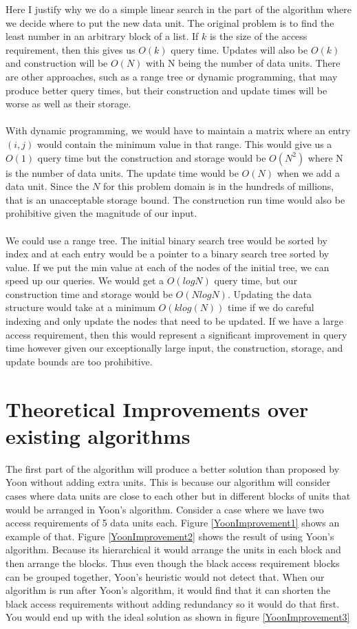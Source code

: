 \documentclass[conference]{acmsiggraph}
\begin{document}
Here I justify why we do a simple linear search in the part of the algorithm where we decide where to put the new data unit. The original problem is to find the least number in an arbitrary block of a list. If $k$ is the size of the access requirement, then this gives us $O(k)$ query time. Updates will also be $O(k)$ and construction will be $O(N)$ with N being the number of data units. There are other approaches, such as a range tree or dynamic programming, that may produce better query times, but their construction and update times will be worse as well as their storage. \\
\\
With dynamic programming, we would have to maintain a matrix where an entry $(i,j)$ would contain the minimum value in that range. This would give us a $O(1)$ query time but the construction and storage would be $O(N^2)$ where N is the number of data units. The update time would be $O(N)$ when we add a data unit. Since the $N$ for this problem domain is in the hundreds of millions, that is an unacceptable storage bound. The construction run time would also be prohibitive given the magnitude of our input. \\
\\
We could use a range tree. The initial binary search tree would be sorted by index and at each entry would be a pointer to a binary search tree sorted by value. If we put the min value at each of the nodes of the initial tree, we can speed up our queries. We would get a $O(log N)$ query time, but our construction time and storage would be $O(N log N)$. Updating the data structure would take at a minimum $O(k log(N))$ time if we do careful indexing and only update the nodes that need to be updated. If we have a large access requirement, then this would represent a significant improvement in query time however given our exceptionally large input, the construction, storage, and update bounds are too prohibitive.  


\section{Theoretical Improvements over existing algorithms}

The first part of the algorithm will produce a better solution than proposed by Yoon without adding extra units. This is because our algorithm will consider cases where data units are close to each other but in different blocks of units that would be arranged in Yoon's algorithm. Consider a case where we have two access requirements of 5 data units each. Figure \ref{YoonImprovement1} shows an example of that. Figure \ref{YoonImprovement2} shows the result of using Yoon's algorithm. Because its hierarchical it would arrange the units in each block and then arrange the blocks. Thus even though the black access requirement blocks can be grouped together, Yoon's heuristic would not detect that. When our algorithm is run after Yoon's algorithm, it would find that it can shorten the black access requirements without adding redundancy so it would do that first. You would end up with the ideal solution as shown in figure \ref{YoonImprovement3}
\end{document}
